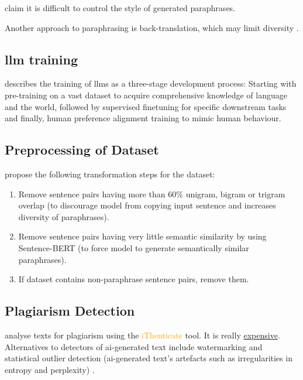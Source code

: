 \citet{zhou_paraphrase_2021} claim it is difficult to control the style of generated paraphrases.

Another approach to paraphrasing is back-translation, which may limit diversity \cite{zhou_paraphrase_2025}.


\subsection{\ac{llm} training}

\citet{master_thesis_paraphrasing_2024} describes the training of \acp{llm} as a three-stage development process:
Starting with pre-training on a vast dataset to acquire comprehensive knowledge of language and the world, 
followed by supervised finetuning for specific downstream tasks and finally,
human preference alignment training to mimic human behaviour.

\subsection{Preprocessing of Dataset}

\citet{palivela_optimization_2021} propose the following transformation steps for the dataset:
\begin{enumerate}
    \item Remove sentence pairs having more than 60$\%$ unigram, bigram or trigram overlap 
    (to discourage model from copying input sentence and increases diversity of paraphrases).
    \item Remove sentence pairs having very little semantic similarity by using Sentence-BERT 
    (to force model to generate semantically similar paraphrases).
    \item If dataset contains non-paraphrase sentence pairs, remove them.   
\end{enumerate}

\subsection{Plagiarism Detection}
\citet{hassanipour_ability_2024} analyse texts for plagiarism using the \textcolor{orange}{iThenticate} tool.
It is really \href{https://www.ithenticate.com/pricing}{expensive}.
Alternatives to detectors of \ac{ai}-generated text include watermarking and statistical outlier detection 
(\ac{ai}-generated text's artefacts such as irregularities in entropy and perplexity) \cite{krishna_paraphrasing_2023}.